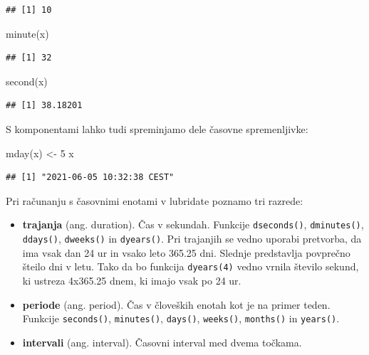 \documentclass[
]{book}
\newenvironment{Shaded}{\begin{snugshade}}{\end{snugshade}}
\newcommand{\DecValTok}[1]{\textcolor[rgb]{0.00,0.00,0.81}{#1}}
\newcommand{\FunctionTok}[1]{\textcolor[rgb]{0.00,0.00,0.00}{#1}}
\newcommand{\NormalTok}[1]{#1}
\newcommand{\OtherTok}[1]{\textcolor[rgb]{0.56,0.35,0.01}{#1}}
\providecommand{\tightlist}{%
  \setlength{\itemsep}{0pt}\setlength{\parskip}{0pt}}
\begin{document}
\begin{verbatim}
## [1] 10
\end{verbatim}

\begin{Shaded}
\begin{Highlighting}[]
\FunctionTok{minute}\NormalTok{(x)}
\end{Highlighting}
\end{Shaded}

\begin{verbatim}
## [1] 32
\end{verbatim}

\begin{Shaded}
\begin{Highlighting}[]
\FunctionTok{second}\NormalTok{(x)}
\end{Highlighting}
\end{Shaded}

\begin{verbatim}
## [1] 38.18201
\end{verbatim}

S komponentami lahko tudi spreminjamo dele časovne spremenljivke:

\begin{Shaded}
\begin{Highlighting}[]
\FunctionTok{mday}\NormalTok{(x) }\OtherTok{\textless{}{-}} \DecValTok{5}
\NormalTok{x}
\end{Highlighting}
\end{Shaded}

\begin{verbatim}
## [1] "2021-06-05 10:32:38 CEST"
\end{verbatim}

Pri računanju s časovnimi enotami v lubridate poznamo tri razrede:

\begin{itemize}
\tightlist
\item
  \textbf{trajanja} (ang. duration). Čas v sekundah. Funkcije \texttt{dseconds()}, \texttt{dminutes()}, \texttt{ddays()}, \texttt{dweeks()} in \texttt{dyears()}. Pri trajanjih se vedno uporabi pretvorba, da ima vsak dan 24 ur in vsako leto 365.25 dni. Slednje predstavlja povprečno šteilo dni v letu. Tako da bo funkcija \texttt{dyears(4)} vedno vrnila število sekund, ki ustreza 4x365.25 dnem, ki imajo vsak po 24 ur.
\item
  \textbf{periode} (ang. period). Čas v človeških enotah kot je na primer teden. Funkcije \texttt{seconds()}, \texttt{minutes()}, \texttt{days()}, \texttt{weeks()}, \texttt{months()} in \texttt{years()}.
\item
  \textbf{intervali} (ang. interval). Časovni interval med dvema točkama.
\end{itemize}
\end{document}

